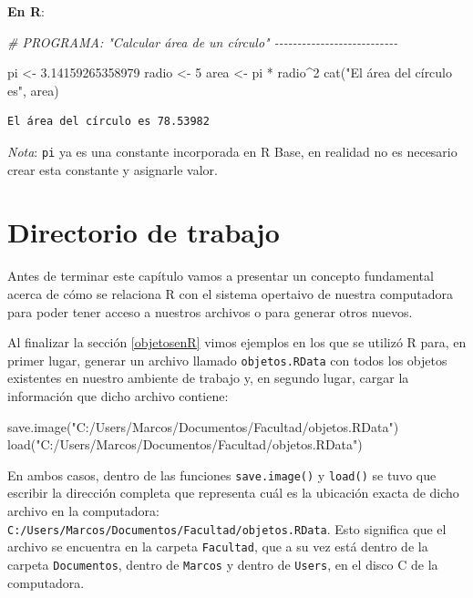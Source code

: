 \documentclass[
]{book}
\newenvironment{Shaded}{\begin{snugshade}}{\end{snugshade}}
\newcommand{\CommentTok}[1]{\textcolor[rgb]{0.56,0.35,0.01}{\textit{#1}}}
\newcommand{\DecValTok}[1]{\textcolor[rgb]{0.00,0.00,0.81}{#1}}
\newcommand{\FloatTok}[1]{\textcolor[rgb]{0.00,0.00,0.81}{#1}}
\newcommand{\FunctionTok}[1]{\textcolor[rgb]{0.00,0.00,0.00}{#1}}
\newcommand{\NormalTok}[1]{#1}
\newcommand{\OtherTok}[1]{\textcolor[rgb]{0.56,0.35,0.01}{#1}}
\newcommand{\SpecialCharTok}[1]{\textcolor[rgb]{0.00,0.00,0.00}{#1}}
\newcommand{\StringTok}[1]{\textcolor[rgb]{0.31,0.60,0.02}{#1}}
\begin{document}
\textbf{En R}:

\begin{Shaded}
\begin{Highlighting}[]
\CommentTok{\# PROGRAMA: "Calcular área de un círculo" {-}{-}{-}{-}{-}{-}{-}{-}{-}{-}{-}{-}{-}{-}{-}{-}{-}{-}{-}{-}{-}{-}{-}{-}{-}{-}{-}}

\NormalTok{pi }\OtherTok{\textless{}{-}} \FloatTok{3.14159265358979}
\NormalTok{radio }\OtherTok{\textless{}{-}} \DecValTok{5}
\NormalTok{area }\OtherTok{\textless{}{-}}\NormalTok{ pi }\SpecialCharTok{*}\NormalTok{ radio}\SpecialCharTok{\^{}}\DecValTok{2}
\FunctionTok{cat}\NormalTok{(}\StringTok{"El área del círculo es"}\NormalTok{, area)}
\end{Highlighting}
\end{Shaded}

\begin{verbatim}
El área del círculo es 78.53982
\end{verbatim}

\emph{Nota}: \texttt{pi} ya es una constante incorporada en R Base, en realidad no es necesario crear esta constante y asignarle valor.

\hypertarget{directorio-de-trabajo}{%
\section{Directorio de trabajo}\label{directorio-de-trabajo}}

Antes de terminar este capítulo vamos a presentar un concepto fundamental acerca de cómo se relaciona R con el sistema opertaivo de nuestra computadora para poder tener acceso a nuestros archivos o para generar otros nuevos.

Al finalizar la sección \ref{objetosenR} vimos ejemplos en los que se utilizó R para, en primer lugar, generar un archivo llamado \texttt{objetos.RData} con todos los objetos existentes en nuestro ambiente de trabajo y, en segundo lugar, cargar la información que dicho archivo contiene:

\begin{Shaded}
\begin{Highlighting}[]
\FunctionTok{save.image}\NormalTok{(}\StringTok{"C:/Users/Marcos/Documentos/Facultad/objetos.RData"}\NormalTok{)}
\FunctionTok{load}\NormalTok{(}\StringTok{"C:/Users/Marcos/Documentos/Facultad/objetos.RData"}\NormalTok{)}
\end{Highlighting}
\end{Shaded}

En ambos casos, dentro de las funciones \texttt{save.image()} y \texttt{load()} se tuvo que escribir la dirección completa que representa cuál es la ubicación exacta de dicho archivo en la computadora: \texttt{C:/Users/Marcos/Documentos/Facultad/objetos.RData}. Esto significa que el archivo se encuentra en la carpeta \texttt{Facultad}, que a su vez está dentro de la carpeta \texttt{Documentos}, dentro de \texttt{Marcos} y dentro de \texttt{Users}, en el disco C de la computadora.
\end{document}
